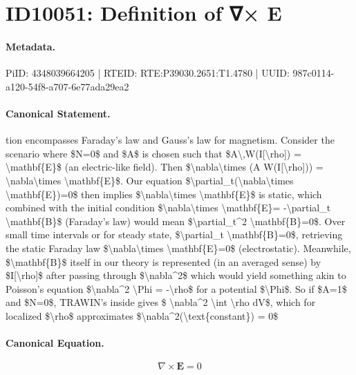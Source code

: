 \section*{ID10051: Definition of ∇× E}
\paragraph{Metadata.}
PiID: 4348039664205 | RTEID: RTE:P39030.2651:T1.4780 | UUID: 987c0114-a120-54f8-a707-6e77ada29ea2

\paragraph{Canonical Statement.}
tion encompasses Faraday’s law and Gauss’s law for magnetism. Consider the scenario where \$N=0\$ and \$A\$ is chosen such that \$A\textbackslash{},W(I[\textbackslash{}rho]) = \textbackslash{}mathbf\{E\}\$ (an electric-like field). Then \$\textbackslash{}nabla\textbackslash{}times (A W(I[\textbackslash{}rho])) = \textbackslash{}nabla\textbackslash{}times \textbackslash{}mathbf\{E\}\$. Our equation \$\textbackslash{}partial\_t(\textbackslash{}nabla\textbackslash{}times \textbackslash{}mathbf\{E\})=0\$ then implies \$\textbackslash{}nabla\textbackslash{}times \textbackslash{}mathbf\{E\}\$ is static, which combined with the initial condition \$\textbackslash{}nabla\textbackslash{}times \textbackslash{}mathbf\{E\}= -\textbackslash{}partial\_t \textbackslash{}mathbf\{B\}\$ (Faraday’s law) would mean \$\textbackslash{}partial\_t\textasciicircum{}2 \textbackslash{}mathbf\{B\}=0\$. Over small time intervals or for steady state, \$\textbackslash{}partial\_t \textbackslash{}mathbf\{B\}=0\$, retrieving the static Faraday law \$\textbackslash{}nabla\textbackslash{}times \textbackslash{}mathbf\{E\}=0\$ (electrostatic). Meanwhile, \$\textbackslash{}mathbf\{B\}\$ itself in our theory is represented (in an averaged sense) by \$I[\textbackslash{}rho]\$ after passing through \$\textbackslash{}nabla\textasciicircum{}2\$ which would yield something akin to Poisson’s equation \$\textbackslash{}nabla\textasciicircum{}2 \textbackslash{}Phi = -\textbackslash{}rho\$ for a potential \$\textbackslash{}Phi\$. So if \$A=1\$ and \$N=0\$, TRAWIN’s inside gives \$ \textbackslash{}nabla\textasciicircum{}2 \textbackslash{}int \textbackslash{}rho dV\$, which for localized \$\textbackslash{}rho\$ approximates \$\textbackslash{}nabla\textasciicircum{}2(\textbackslash{}text\{constant\}) = 0\$

\paragraph{Canonical Equation.}
\[
\nabla\times \mathbf{E}=0
\]

